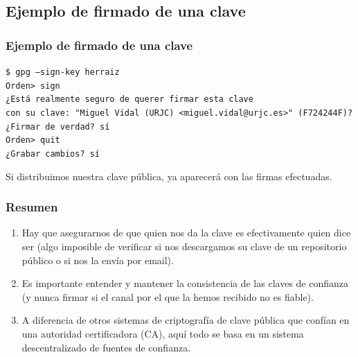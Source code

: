 \documentclass{beamer}
\begin{document}

\subsection{Ejemplo de firmado de una clave}

\begin{frame}
\frametitle{Ejemplo de firmado de una clave}

\begin{block}{}
\texttt{\alert{\$ gpg --sign-key herraiz}} \\
\texttt{Orden> sign} \\
\footnotesize{\texttt{¿Está realmente seguro de querer firmar esta clave \\
con su clave: "Miguel Vidal (URJC) <miguel.vidal@urjc.es>" (F724244F)?}} \\

\medskip
\normalsize
\texttt{¿Firmar de verdad? sí} \\
\texttt{Orden> quit} \\
\texttt{¿Grabar cambios? sí} \\

\end{block}

\begin{center}
Si distribuimos nuestra clave pública, ya aparecerá con las firmas efectuadas.
\end{center}

\end{frame}


\begin{frame}
\frametitle{Resumen}

\begin{enumerate}
\item Hay que asegurarnos de que quien nos da la clave es efectivamente quien dice ser (algo imposible de verificar si nos descargamos su clave de un repositorio público o si nos la envía por email).
\item Es importante entender y mantener la consistencia de las claves de confianza (y nunca firmar si el canal por el que la hemos recibido no es fiable).
\item A diferencia de otros sistemas de criptografía de clave pública que confían en una autoridad certificadora (CA), aquí todo se basa en un \alert{sistema descentralizado} de fuentes de confianza.
\end{enumerate}

\end{frame}
\end{document}
